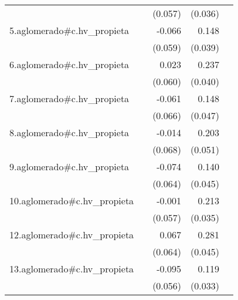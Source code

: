 {\begin{longtable}{l*{4}{D{.}{.}{-1}}}
            &                     &     (0.057)         &     (0.036)         &                     \\
\addlinespace
5.aglomerado#c.hv\_propieta&                     &      -0.066         &       0.148\sym{***}&                     \\
            &                     &     (0.059)         &     (0.039)         &                     \\
\addlinespace
6.aglomerado#c.hv\_propieta&                     &       0.023         &       0.237\sym{***}&                     \\
            &                     &     (0.060)         &     (0.040)         &                     \\
\addlinespace
7.aglomerado#c.hv\_propieta&                     &      -0.061         &       0.148\sym{**} &                     \\
            &                     &     (0.066)         &     (0.047)         &                     \\
\addlinespace
8.aglomerado#c.hv\_propieta&                     &      -0.014         &       0.203\sym{***}&                     \\
            &                     &     (0.068)         &     (0.051)         &                     \\
\addlinespace
9.aglomerado#c.hv\_propieta&                     &      -0.074         &       0.140\sym{**} &                     \\
            &                     &     (0.064)         &     (0.045)         &                     \\
\addlinespace
10.aglomerado#c.hv\_propieta&                     &      -0.001         &       0.213\sym{***}&                     \\
            &                     &     (0.057)         &     (0.035)         &                     \\
\addlinespace
12.aglomerado#c.hv\_propieta&                     &       0.067         &       0.281\sym{***}&                     \\
            &                     &     (0.064)         &     (0.045)         &                     \\
\addlinespace
13.aglomerado#c.hv\_propieta&                     &      -0.095         &       0.119\sym{***}&                     \\
            &                     &     (0.056)         &     (0.033)         &                     \\

\end{longtable}}
